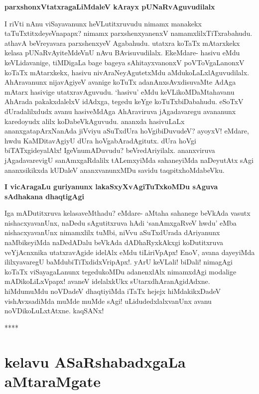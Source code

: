 {\bigskip
\noindent
{\large\bf parxshonxVtatxragaLiMdaleV kArayx pUNaRvAguvudilalx}}\label{page213b}
\medskip

\noindent
I riVti nAnu viSayavanunx heVLutitxruvudu nimamx manakekx taTuTxtitxdeyeVnapapx? \hbox{nimamx} parxshenxyanenxV namamxlilxTiTxrabahudu. athavA beVreyavara parxshenxyeV Agabahudu. utatxra koTaTx mAtarxkekx kelasa pUNaRvAyiteMdeVnU nAvu BAvisuvudilalx. EkeMdare- hasivu eMdu keVLidavanige, tiMDigaLa bage bageya sAhitayxvanonxV poVToVgaLanonxV koTaTx mAtarxkekx, hasivu nivAraNeyAgutetxMdu aMdukoLaLxlAguvudilalx. AhAravanunx nijavAgiyeV avanige koTuTx adanAnxsAvxdisuvaMte AdAga mAtarx hasivige utatxravAguvudu. `hasivu' eMdu keVLikoMDaMtahavanu AhArada pakakxdalelxV idAdxga, tegedu keYge koTuTxbiDabahudu. eSoTxV dUradalilxdudx avanu hasiveMdAga AhAraviruva jAgadavaregu avananunx karedoyudx alilx koDabeVkAguvudu. ananxda hasivuLaLx ananxgatapArxNanAda jiVviyu aSuTxdUra hoVgibiDuvudeV? ayoyxV! eMdare, hwdu KaMDitavAgiyU dUra hoVgabAradAgitutx. dUra hoVgi biTATxgideyalAlx! IgeVnumADuvudu? beVredAriyilalx. ananxviruva jAgadavarevigU sanAmxgaRdalilx tALemxyiMda sahaneyiMda naDeyutAtx sAgi ananxsikikxda kUDaleV ananxvanunxMDu savidu taqpitxhoMdabeVku.

{\bigskip
\noindent
{\large\bf I vicAragaLu guriyanunx lakaSxyXvAgiTuTxkoMDu sAguva sAdhakana dhaqtigAgi}}\label{page218}
\medskip

\noindent
Iga mADutitxruva kelasaveMthadu? eMdare- aMtaha sahanege beVkAda vasutx nishacxyavanUnx, naDedu sAgutitxruva hAdi `sanAmxgaRveV hwdu' eMba nishacxyavanUnx nimamxlilx tuMbi, niVvu aSuTxdUrada dAriyanunx naMbikeyiMda naDedADalu beVkAda dADhaRyxkAkxgi koDutitxruva veYjAcnxnika utatxravAgide idelAlx eMdu tiLiriVpApx! EnoV, avana dayeyiMda ililxyavaregU baMdubiTiTxdidxVripApx!. yArU keVLali! biDali! nimagAgi koTaTx viSayagaLanunx tegedukoMDu adanenxlAlx nimamxdAgi modalige mADikoLiLxVpapx! avaneV idelalxkUkx sUtarxdhAranAgidAdxne. hiMdumuMdu noVDadeV dhaqtiyiMda iTaTx hejejx hiMdakikxDadeV vishAvxsadiMda muMde muMde sAgi! uLidudedxlalxvanUnx avanu noVDikoLuLxtAtxne. kaqSANx!

\medskip

\begin{center}
****
\end{center}

\newpage

\chapter{kelavu ASaRshabadxgaLa aMtaraMgate}

